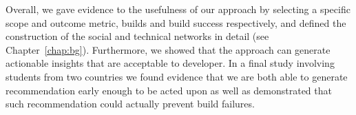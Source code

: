Overall, we gave evidence to the usefulness of our approach by selecting a specific scope and outcome metric, builds and build success respectively, and defined the construction of the social and technical networks in detail (see Chapter~\ref{chap:bg}).
Furthermore, we showed that the approach can generate actionable insights that are acceptable to developer.
In a final study involving students from two countries we found evidence that we are both able to generate recommendation early enough to be acted upon as well as demonstrated that such recommendation could actually prevent build failures.


%
%
%
